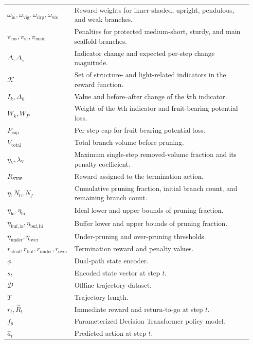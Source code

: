 \documentclass[12pt,a4paper,fontset=fandol]{ctexart}
\begin{document}
\begin{longtable}{>{\raggedright\arraybackslash}p{}
                  >{\raggedright\arraybackslash}p{}}
$\omega_{\mathrm{in}}, \omega_{\mathrm{vig}}, \omega_{\mathrm{drp}}, \omega_{\mathrm{wk}}$ & Reward weights for inner-shaded, upright, pendulous, and weak branches. \\
$\pi_{\mathrm{ms}}, \pi_{\mathrm{st}}, \pi_{\mathrm{main}}$ & Penalties for protected medium-short, sturdy, and main scaffold branches. \\
$\Delta, \Delta_e$ & Indicator change and expected per-step change magnitude. \\
$\mathcal{K}$ & Set of structure- and light-related indicators in the reward function. \\
$I_k, \Delta_k$ & Value and before--after change of the $k$th indicator. \\
$W_k, W_P$ & Weight of the $k$th indicator and fruit-bearing potential loss. \\
$P_{\mathrm{cap}}$ & Per-step cap for fruit-bearing potential loss. \\
$V_{\mathrm{total}}$ & Total branch volume before pruning. \\
$\eta_V, \lambda_V$ & Maximum single-step removed-volume fraction and its penalty coefficient. \\
$R_{\texttt{STOP}}$ & Reward assigned to the termination action. \\
$\eta, N_0, N_f$ & Cumulative pruning fraction, initial branch count, and remaining branch count. \\
$\eta_{\mathrm{lo}}, \eta_{\mathrm{hi}}$ & Ideal lower and upper bounds of pruning fraction. \\
$\eta_{\mathrm{buf,lo}}, \eta_{\mathrm{buf,hi}}$ & Buffer lower and upper bounds of pruning fraction. \\
$\eta_{\mathrm{under}}, \eta_{\mathrm{over}}$ & Under-pruning and over-pruning thresholds. \\
$r_{\mathrm{ideal}}, r_{\mathrm{buf}}, r_{\mathrm{under}}, r_{\mathrm{over}}$ & Termination reward and penalty values. \\
$\phi$ & Dual-path state encoder. \\
$s_t$ & Encoded state vector at step $t$. \\
$\mathcal{D}$ & Offline trajectory dataset. \\
$T$ & Trajectory length. \\
$r_t, \hat{R}_t$ & Immediate reward and return-to-go at step $t$. \\
$f_\theta$ & Parameterized Decision Transformer policy model. \\
$\hat{a}_t$ & Predicted action at step $t$. \\

\end{longtable}
\end{document}
